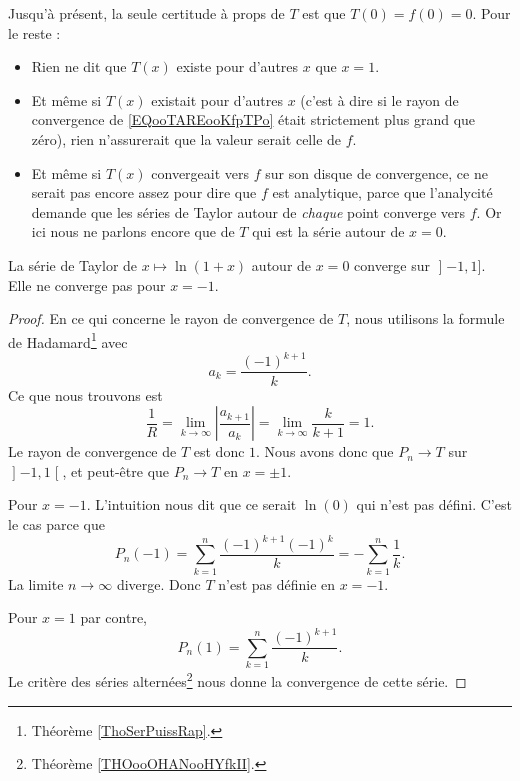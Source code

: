 Jusqu'à présent, la seule certitude à props de \( T\) est que \( T(0)=f(0)=0\). Pour le reste :
\begin{itemize}
    \item Rien ne dit que \( T(x)\) existe pour d'autres \( x\) que \( x=1\).
    \item Et même si \( T(x)\) existait pour d'autres \( x\) (c'est à dire si le rayon de convergence de \eqref{EQooTAREooKfpTPo} était strictement plus grand que zéro), rien n'assurerait que la valeur serait celle de \( f\).
    \item Et même si \( T(x)\) convergeait vers \( f\) sur son disque de convergence, ce ne serait pas encore assez pour dire que \( f\) est analytique, parce que l'analycité demande que les séries de Taylor autour de \emph{chaque} point converge vers \( f\). Or ici nous ne parlons encore que de \( T\) qui est la série autour de \( x=0\).
\end{itemize}

\begin{lemma}       \label{LEMooWMGGooRpAxBa}
    La série de Taylor de \( x\mapsto \ln(1+x)\) autour de \( x=0\) converge sur \( \mathopen] -1 , 1 \mathclose]\). Elle ne converge pas pour \( x=-1\).
\end{lemma}

\begin{proof}
        
    En ce qui concerne le rayon de convergence de \( T\), nous utilisons la formule de Hadamard\footnote{Théorème \ref{ThoSerPuissRap}.} avec
    \begin{equation}
        a_k=\frac{ (-1)^{k+1} }{ k }.
    \end{equation}
    Ce que nous trouvons est
    \begin{equation}
        \frac{1}{ R }=\lim_{k\to \infty} | \frac{ a_{k+1} }{ a_k } |=\lim_{k\to \infty} \frac{ k }{ k+1 }=1.
    \end{equation}
    Le rayon de convergence de \( T\) est donc \( 1\). Nous avons donc que \( P_n\to T\) sur \( \mathopen] -1 , 1 \mathclose[\), et peut-être que \( P_n\to T\) en \( x=\pm 1\).

    Pour \( x=-1\). L'intuition nous dit que ce serait \( \ln(0)\) qui n'est pas défini. C'est le cas parce que 
    \begin{equation}
        P_n(-1)=\sum_{k=1}^n\frac{ (-1)^{k+1}(-1)^k }{ k }=-\sum_{k=1}^n\frac{1}{ k }.
    \end{equation}
    La limite \( n\to \infty\) diverge. Donc \( T\) n'est pas définie en \( x=-1\).

    Pour \( x=1\) par contre,
    \begin{equation}
        P_n(1)=\sum_{k=1}^n\frac{ (-1)^{k+1} }{ k }.
    \end{equation}
    Le critère des séries alternées\footnote{Théorème \ref{THOooOHANooHYfkII}.} nous donne la convergence de cette série.
\end{proof}

